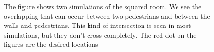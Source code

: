 \begin{figure}[h]
\centering
{}
\caption{The figure shows two simulations of the squared room. We see the overlapping that can occur between two pedestrians and between the walls and pedestrians. This kind of intersection is seen in most simulations, but they don't cross completely. The red dot on the figures are the desired locations}
\label{fig:overlapping}
\end{figure}

